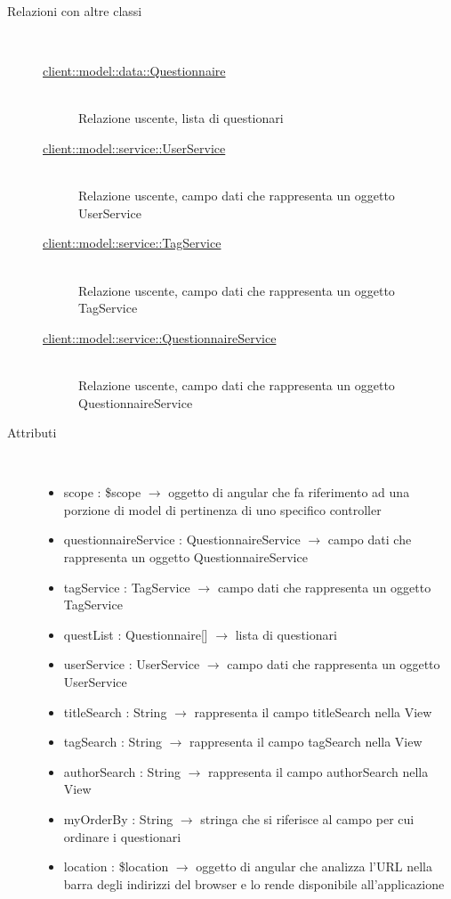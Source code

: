 \begin{description}
\item[Relazioni con altre classi] \hfill \\
\vspace{-7mm}
\begin{description}
	\item[\hyperlink{client::model::data::Questionnaire}{client::model::data::Questionnaire}] \hfill \\
	Relazione uscente, lista di questionari
	\item[\hyperlink{client::model::service::UserService}{client::model::service::UserService}] \hfill \\
	Relazione uscente, campo dati che rappresenta un oggetto UserService
	\item[\hyperlink{client::model::service::TagService}{client::model::service::TagService}] \hfill \\
	Relazione uscente, campo dati che rappresenta un oggetto TagService
	\item[\hyperlink{client::model::service::QuestionnaireService}{client::model::service::QuestionnaireService}] \hfill \\
	Relazione uscente, campo dati che rappresenta un oggetto QuestionnaireService
\end{description}

\item[Attributi] \hfill \\
\vspace{-7mm}
\begin{itemize}
	\item scope : \$scope $\rightarrow$ oggetto di angular che fa riferimento ad una porzione di model di pertinenza di uno specifico controller
	\item questionnaireService : QuestionnaireService $\rightarrow$ campo dati che rappresenta un oggetto QuestionnaireService
	\item tagService : TagService $\rightarrow$ campo dati che rappresenta un oggetto TagService
	\item questList : Questionnaire[] $\rightarrow$ lista di questionari
	\item userService : UserService $\rightarrow$ campo dati che rappresenta un oggetto UserService
	\item titleSearch : String $\rightarrow$ rappresenta il campo titleSearch nella View
	\item tagSearch : String $\rightarrow$ rappresenta il campo tagSearch nella View
	\item authorSearch : String $\rightarrow$ rappresenta il campo authorSearch nella View
	\item myOrderBy : String $\rightarrow$ stringa che si riferisce al campo per cui ordinare i questionari
	\item location : \$location $\rightarrow$ oggetto di angular che analizza l'URL nella barra degli indirizzi del browser e lo rende disponibile all'applicazione
\end{itemize}


\end{description}
